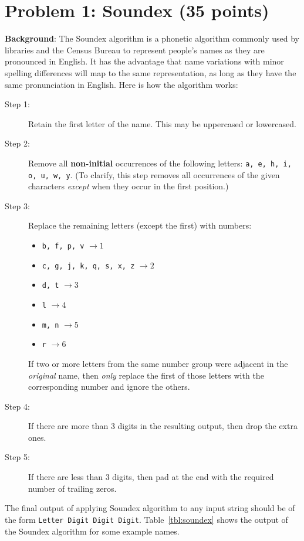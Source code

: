 \documentclass[11pt]{article}
\begin{document}
\section*{Problem 1: Soundex (35 points)} %
\label{sec:problem_2}
\textbf{Background}: The Soundex algorithm is a phonetic algorithm
commonly used by libraries and the Census Bureau to represent people's
names as they are pronounced in English. It has the advantage that
name variations with minor spelling differences will map to the same
representation, as long as they have the same pronunciation in
English. Here is how the algorithm works:
\begin{description}
	\item[Step 1:] Retain the first letter of the name. This may
          be uppercased or lowercased.
	\item[Step 2:] Remove all \textbf{non-initial} occurrences of
          the following letters: \texttt{a, e, h, i, o, u, w, y}. (To
          clarify, this step removes all occurrences of the given
          characters \emph{except} when they occur in the first
          position.)
	\item[Step 3:] Replace the remaining letters (except the
          first) with numbers:
	\begin{itemize}
		\item \texttt{b, f, p, v} $\rightarrow 1$
		\item \texttt{c, g, j, k, q, s, x, z} $\rightarrow 2$
		\item \texttt{d, t} $\rightarrow 3$
		\item \texttt{l} $\rightarrow 4$
		\item \texttt{m, n} $\rightarrow 5$
		\item \texttt{r} $\rightarrow 6$
	\end{itemize}
 	If two or more letters from the same number group were
        adjacent in the \emph{original} name, then \emph{only} replace
        the first of those letters with the corresponding number and
        ignore the others.
 	\item[Step 4:] If there are more than $3$ digits in the
          resulting output, then drop the extra ones.
 	\item[Step 5:] If there are less than $3$ digits, then pad at
          the end with the required number of trailing zeros.
\end{description}


 The final output of applying Soundex algorithm to any input string
 should be of the form \texttt{Letter Digit Digit
   Digit}. Table~\ref{tbl:soundex} shows the output of the Soundex
 algorithm for some example names.  \\
\end{document}
